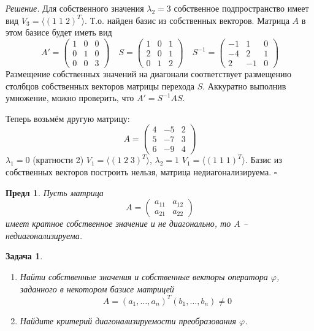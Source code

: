 \documentclass[a4paper,12pt]{article}
\newtheorem{propos}{Предл}[section]
\newtheorem*{prob}{Задача}
\newenvironment{soln}{\noindent\textit{Решение.}}{\hfill$\square$}
\begin{document}
\begin{soln}
	Для собственного значения $\lambda_2 = 3$ собственное подпространство имеет вид $V_3 = \langle (1 \; 1 \; 2)^T \rangle$. Т.о. найден базис из собственных векторов. Матрица $A$ в этом базисе будет иметь вид
	\[
		A' = \begin{pmatrix}
			1 & 0 & 0 \\
			0 & 1 & 0 \\
			0 & 0 & 3
		\end{pmatrix} \quad		
		S = \begin{pmatrix}
			1 & 0 & 1 \\
			2 & 0 & 1 \\
			0 & 1 & 2
		\end{pmatrix} \quad		
		S^{-1} = \begin{pmatrix}
			-1 & 1 & 0 \\
			-4 & 2 & 1 \\
			2 & -1 & 0
		\end{pmatrix}		
	\]
	Размещение собственных значений на диагонали соответствует размещению столбцов собственных векторов матрицы перехода $S$. Аккуратно выполнив умножение, можно проверить, что $A' = S^{-1} A S$. 
	
	Теперь возьмём другую матрицу:
	\[
		A = \begin{pmatrix}
			4 & -5 & 2 \\
			5 & -7 & 3 \\
			6 & -9 & 4
		\end{pmatrix}
	\]
	$\lambda_1 = 0$ (кратности 2) $V_1 = \langle (1 \; 2 \; 3)^T \rangle$, $\lambda_2 = 1$ $V_1 = \langle (1 \; 1 \; 1)^T \rangle$. Базис из собственных векторов построить нельзя, матрица недиагонализируема.
\end{soln}

\begin{propos}
	Пусть матрица 
	\[
		A = \begin{pmatrix}
			a_{11} & a_{12} \\
			a_{21} & a_{22} 
		\end{pmatrix}
	\]
	имеет кратное собственное значение и не диагонально, то $A$ -- недиагонализируема.
\end{propos}

\begin{prob}
	\begin{enumerate}
		\item Найти собственные значения и собственные векторы оператора $\varphi$, заданного в некотором базисе матрицей 
		\[
			A = (a_1, \ldots, a_n)^T (b_1, \ldots, b_n) \ne 0
		\]
		\item Найдите критерий диагонализируемости преобразования $\varphi$.
	\end{enumerate}
\end{prob}
\end{document}
